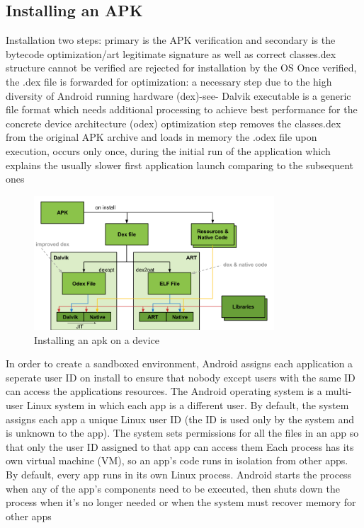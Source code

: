 \subsection{Installing an APK} \label{subsection:android-install}

Installation two steps:  primary is the APK verification and secondary is the bytecode optimization/art\newline
legitimate signature as well as correct classes.dex structure cannot be verified are rejected for installation by the OS\newline
Once verified, the .dex file is forwarded for optimization: a necessary step due to the high diversity of Android running hardware (dex)-see- Dalvik executable is a generic file format which needs additional processing to achieve best performance for the concrete device architecture (odex)\newline
optimization\newline
step removes the classes.dex from the original APK archive and loads in memory the .odex file upon execution, occurs only once, during the initial run of the application which explains the usually slower first application launch comparing to the subsequent ones\cite{kovachevaMaster}
\begin{figure}[h]
    \centering
    \includegraphics[width=0.8\textwidth]{data/install.png}
    \caption{Installing an \gls{apk} on a device \cite{googleIOArt}}
    \label{fig:install}
\end{figure}

In order to create a sandboxed environment, Android assigns each application a seperate user ID on install to ensure that nobody except users with the same ID can access the applications resources.
The Android operating system is a multi-user Linux system in which each app is a different user.
By default, the system assigns each app a unique Linux user ID (the ID is used only by the system and is unknown to the app). The system sets permissions for all the files in an app so that only the user ID assigned to that app can access them
Each process has its own virtual machine (VM), so an app's code runs in isolation from other apps.
By default, every app runs in its own Linux process. Android starts the process when any of the app's components need to be executed, then shuts down the process when it's no longer needed or when the system must recover memory for other apps\cite{developerFundamentals}

